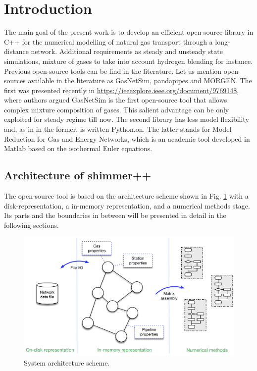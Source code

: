 \section{Introduction}

The main goal of the present work is to develop an efficient open-source library in C++ for the numerical modelling of natural gas transport through a long-distance network. Additional requirements   as steady and unsteady state simulations, mixture of gases to take into account hydrogen blending for instance. Previous open-source tools can be find in the literature. Let us mention open-sources available in the literature as GasNetSim, pandapipes and MORGEN. The first was presented recently in \url{https://ieeexplore.ieee.org/document/9769148}, where authors argued GasNetSim is the first open-source tool that allows complex mixture composition of gases. This salient advantage can be only exploited for steady regime till now. The second library has less model flexibility and, as in in the former, is written Python.on. The latter stands for Model Reduction for Gas and Energy Networks, which is an academic tool developed in Matlab based on the isothermal Euler equations.   

\subsection{Architecture of shimmer++} 
The open-source tool is based on the architecture scheme shown in Fig. \ref{intro:architecture} with a disk-representation, a in-memory representation, and a numerical methods stage. Its parts and the boundaries in between will be presented in detail in the following sections.
\begin{figure}[H]
    \centering
    \includegraphics[scale = 0.7]{img_intro/system_arch.pdf}  
    \caption{System architecture scheme.}
    \label{intro:architecture}
\end{figure}

